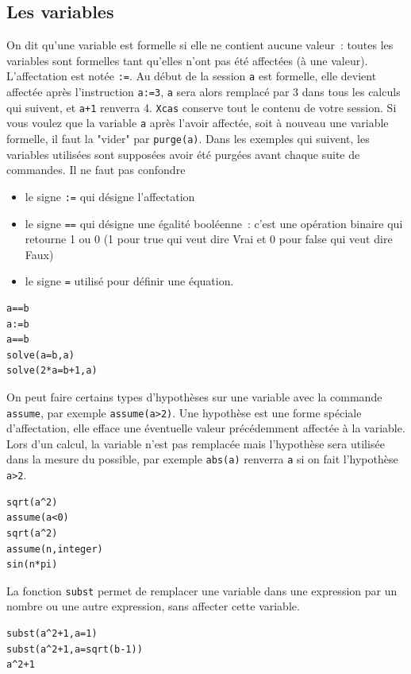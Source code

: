 \documentclass{article}
\begin{document}
\subsection{Les variables}
%
On dit qu'une variable est formelle si elle ne contient aucune valeur~: 
toutes les variables sont formelles tant qu'elles n'ont pas \'et\'e
affect\'ees (\`a une valeur).
L'affectation est not\'ee \verb|:=|. Au d\'ebut 
de la session  \verb|a| 
est formelle, elle devient affect\'ee apr\`es l'instruction 
\verb|a:=3|, \verb|a| sera alors remplac\'e par 3 dans tous
les calculs qui suivent, et \verb|a+1| renverra 4. 
{\tt Xcas} conserve tout le contenu de votre session. Si vous voulez que la variable 
\verb|a| apr\`es l'avoir affect\'ee, soit \`a nouveau une variable formelle, il
faut la "vider" par \verb|purge(a)|. Dans les exemples qui suivent, les 
variables utilis\'ees sont suppos\'ees avoir \'et\'e purg\'ees avant chaque
suite de commandes.
\noindent
Il ne faut pas confondre
\begin{itemize}
\item le signe \verb|:=| qui d\'esigne l'affectation
\item le signe \verb|==| qui d\'esigne une \'egalit\'e
  bool\'eenne~: c'est une op\'eration binaire qui retourne 1 ou 0 (1 pour true
qui veut dire Vrai et 0 pour false qui veut dire Faux) 
\item le signe \verb|=| utilis\'e pour d\'efinir une \'equation.
\end{itemize}
\begin{verbatim}
a==b
a:=b
a==b
solve(a=b,a)
solve(2*a=b+1,a)
\end{verbatim}
On peut faire certains types d'hypoth\`eses sur une variable avec
la commande \verb|assume|, par exemple \verb|assume(a>2)|. Une
hypoth\`ese est une forme sp\'eciale d'affectation, elle efface
une \'eventuelle valeur pr\'ec\'edemment affect\'ee \`a la variable.
Lors d'un calcul, la variable n'est pas remplac\'ee mais
l'hypoth\`ese sera utilis\'ee dans la mesure du possible, par exemple
\verb|abs(a)| renverra \verb|a| si on fait l'hypoth\`ese \verb|a>2|.
\begin{verbatim}
sqrt(a^2)
assume(a<0)
sqrt(a^2)
assume(n,integer)
sin(n*pi)
\end{verbatim}
La fonction \verb|subst| permet de remplacer une variable dans une
expression par un nombre ou une autre expression, 
sans affecter cette variable.
\begin{verbatim}
subst(a^2+1,a=1)
subst(a^2+1,a=sqrt(b-1))
a^2+1
\end{verbatim} 
\end{document}
